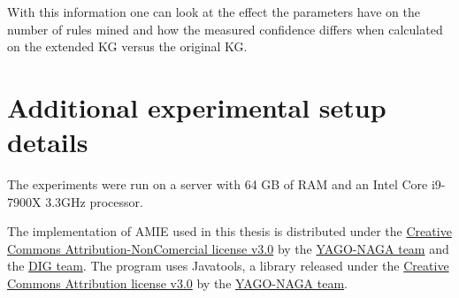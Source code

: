 With this information one can look at the effect the parameters have on the number of rules mined and how the measured confidence differs when calculated on the extended KG versus the original KG.


\section{Additional experimental setup details}
The experiments were run on a server with 64 GB of RAM and an Intel Core i9-7900X 3.3GHz processor.

The implementation of AMIE used in this thesis is distributed under the \hyperlink{https://creativecommons.org/licenses/by-nc/3.0/}{Creative Commons Attribution-NonComercial license v3.0} by the \hyperlink{https://www.mpi-inf.mpg.de/departments/databases-and-information-systems/research/yago-naga/amie/}{YAGO-NAGA team} and the \hyperlink{https://dig.telecom-paris.fr/blog/}{DIG team}. The program uses Javatools, a library released under the \hyperlink{https://creativecommons.org/licenses/by/3.0/}{Creative Commons Attribution license v3.0} by the \hyperlink{https://www.mpi-inf.mpg.de/departments/databases-and-information-systems/research/yago-naga/amie/}{YAGO-NAGA team}.
